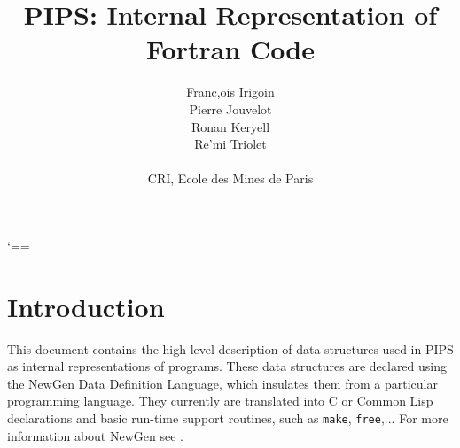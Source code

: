 
% 

\title{PIPS: Internal Representation of Fortran Code}
\author{Franc,ois Irigoin \\
        Pierre Jouvelot \\
    Ronan Keryell \\
        Re'mi Triolet\\
\\
        CRI, Ecole des Mines de Paris}

      {
        \catcode `==\active
        \gdef\domain{\medskip\par\noindent
          \bgroup
          \catcode `_ \other
          \catcode `= \active
          \def={\em{\rm \string=}}
          \tt\em\vraidomain}
        \gdef\vraidomain#1{#1\egroup\medskip\par}
        }


\renewcommand{\indexname}{Index}

\makeindex


\maketitle
\sloppy

\section*{Introduction}

This document contains the high-level description of data structures
used in PIPS as internal representations of programs. These data
structures are declared using the NewGen Data Definition Language, which
insulates them from a particular programming language. They currently
are translated into C or Common Lisp declarations and basic run-time
support routines, such as \verb+make+, \verb+free+,... For more
information about NewGen see \cite{}\cite{}.

